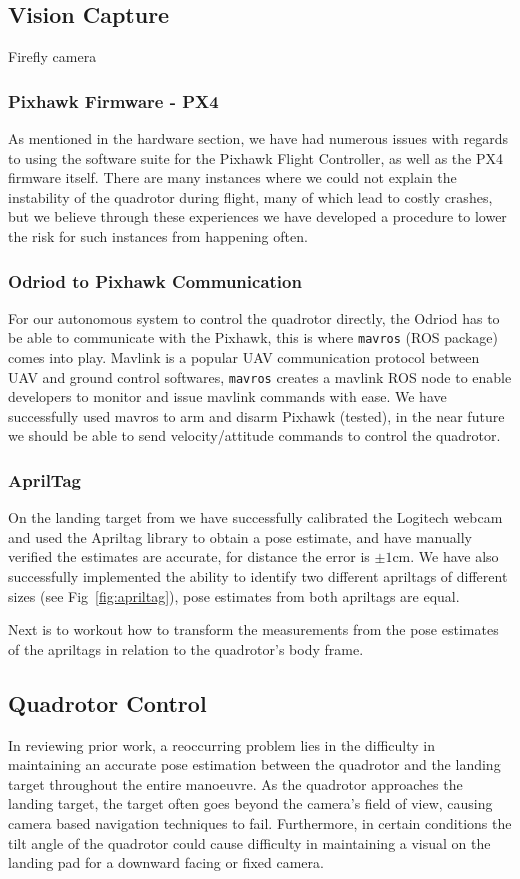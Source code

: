 \documentclass[11pt, twocolumn]{article}
\begin{document}
\subsection{Vision Capture}
Firefly camera

\subsubsection{Pixhawk Firmware - PX4}
As mentioned in the hardware section, we have had numerous issues with regards to using the software suite for the Pixhawk Flight Controller, as well as the PX4 firmware itself. There are many instances where we could not explain the instability of the quadrotor during flight, many of which lead to costly crashes, but we believe through these experiences we have developed a procedure to lower the risk for such instances from happening often.

\subsubsection{Odriod to Pixhawk Communication}
For our autonomous system to control the quadrotor directly, the Odriod has to be able to communicate with the Pixhawk, this is where \verb|mavros| (ROS package) comes into play. Mavlink is a popular UAV communication protocol between UAV and ground control softwares, \verb|mavros| creates a mavlink ROS node to enable developers to monitor and issue mavlink commands with ease. We have successfully used mavros to arm and disarm Pixhawk (tested), in the near future we should be able to send velocity/attitude commands to control the quadrotor.

\subsubsection{AprilTag}
On the landing target from we have successfully calibrated the Logitech webcam and used the Apriltag library to obtain a pose estimate, and have manually verified the estimates are accurate, for distance the error is $\pm 1$cm. We have also successfully implemented the ability to identify two different apriltags of different sizes (see Fig~\ref{fig:apriltag}), pose estimates from both apriltags are equal.

Next is to workout how to transform the measurements from the pose estimates of the apriltags in relation to the quadrotor's body frame.


\subsection{Quadrotor Control}
In reviewing prior work, a reoccurring problem lies in the difficulty in maintaining an accurate pose estimation between the quadrotor and the landing target throughout the entire manoeuvre. As the quadrotor approaches the landing target, the target often goes beyond the camera's field of view, causing camera based navigation techniques to fail. Furthermore, in certain conditions the tilt angle of the quadrotor could cause difficulty in maintaining a visual on the landing pad for a downward facing or fixed camera. 
\end{document}
